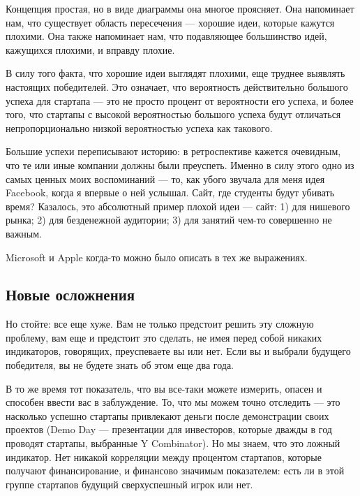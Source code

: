 \documentclass[ebook,12pt,oneside,openany]{memoir}
\begin{document}
Концепция простая, но в виде диаграммы она многое проясняет. Она
напоминает нам, что существует область пересечения — хорошие идеи,
которые кажутся плохими. Она также напоминает нам, что подавляющее
большинство идей, кажущихся плохими, и вправду плохие. \newline

В силу того факта, что хорошие идеи выглядят плохими, еще труднее
выявлять настоящих победителей. Это означает, что вероятность
действительно большого успеха для стартапа — это не просто процент от
вероятности его успеха, и более того, что стартапы с высокой
вероятностью большого успеха будут отличаться непропорционально низкой
вероятностью успеха как такового. \newline

Большие успехи переписывают историю: в ретроспективе кажется
очевидным, что те или иные компании должны были преуспеть. Именно в
силу этого одно из самых ценных моих воспоминаний — то, как убого
звучала для меня идея Facebook, когда я впервые о ней услышал. Сайт,
где студенты будут убивать время? Казалось, это абсолютный пример
плохой идеи — сайт: 1) для нишевого рынка; 2) для безденежной
аудитории; 3) для занятий чем-то совершенно не важным. \newline

Microsoft и Apple когда-то можно было описать в тех же выражениях. \newline

\subsection{Новые осложнения}

Но стойте: все еще хуже. Вам не только предстоит решить эту сложную
проблему, вам еще и предстоит это сделать, не имея перед собой никаких
индикаторов, говорящих, преуспеваете вы или нет. Если вы и выбрали
будущего победителя, вы не будете знать об этом еще два года. \newline

В то же время тот показатель, что вы все-таки можете измерить, опасен
и способен ввести вас в заблуждение. То, что мы можем точно отследить
— это насколько успешно стартапы привлекают деньги после демонстрации
своих проектов (Demo Day — презентации для инвесторов, которые дважды
в год проводят стартапы, выбранные Y Combinator). Но мы знаем, что это
ложный индикатор. Нет никакой корреляции между процентом стартапов,
которые получают финансирование, и финансово значимым показателем:
есть ли в этой группе стартапов будущий сверхуспешный игрок или нет. \newline
\end{document}
